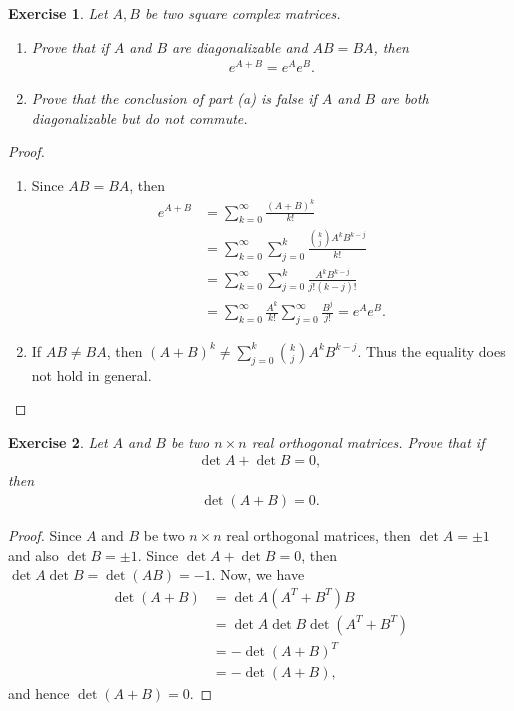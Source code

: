 \documentclass[11pt]{article}
\newtheorem{exercise}{Exercise}[section]
\theoremstyle{definition}
\numberwithin{equation}{subsection}
\begin{document}
\begin{exercise}
Let $A, B$ be two square complex matrices.
\begin{enumerate}[label=(\alph*)]
    \item Prove that if $A$ and $B$ are diagonalizable and $AB = BA$, then
    \begin{align*}
        e^{A + B} = e^A e^B.
    \end{align*}
    
    \item Prove that the conclusion of part (a) is false if $A$ and $B$ are both diagonalizable but do not commute.
\end{enumerate}
\end{exercise}
\begin{proof}
~\begin{enumerate}[label=(\alph*)]
    \item Since $AB = BA$, then
    \begin{align*}
        e^{A+B} & = \sum^\infty_{k=0} \frac{(A+B)^k}{k!} \\
        & = \sum^\infty_{k=0} \sum^k_{j=0} \frac{\binom{k}{j}A^k B^{k-j}}{k!} \\
        & = \sum^\infty_{k=0} \sum^k_{j=0} \frac{A^k B^{k-j}}{j!(k-j)!} \\
        & = \sum^\infty_{k=0} \frac{A^k}{k!} \sum^\infty_{j=0} \frac{B^j}{j!} = e^A e^B.
    \end{align*}
    
    \item If $AB \neq BA$, then $(A + B)^k \neq \sum^k_{j=0}\binom{k}{j}A^k B^{k-j}$. Thus the equality does not hold in general.
\end{enumerate}
\end{proof}

\medskip

\begin{exercise}{\rm *}
Let $A$ and $B$ be two $n \times n$ real orthogonal matrices. Prove that if
\begin{align*}
    \det A + \det B = 0,
\end{align*}
then 
\begin{align*}
    \det(A + B) = 0.
\end{align*}
\end{exercise}
\begin{proof}
Since $A$ and $B$ be two $n \times n$ real orthogonal matrices, then $\det A = \pm 1$ and also $\det B = \pm 1$. Since $\det A + \det B = 0$, then $\det A \det B = \det (AB) = -1$. Now, we have
\begin{align*}
    \det (A + B) & = \det A\left(A^T + B^T\right)B \\
    & = \det A \det B \det \left(A^T + B^T\right) \\
    & = - \det (A + B)^T \\
    & = - \det (A + B),
\end{align*}
and hence $\det (A + B) = 0$.
\end{proof}
\end{document}
